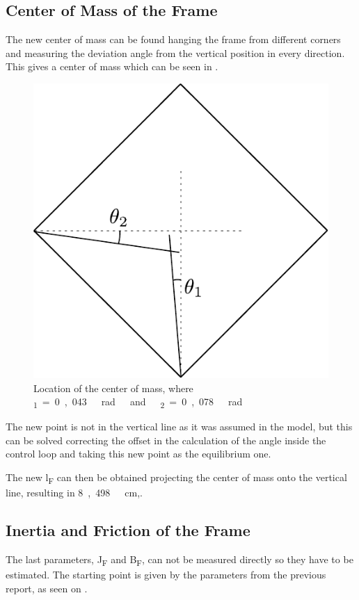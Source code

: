 \subsection{Center of Mass of the Frame}
The new center of mass can be found hanging the frame from different corners and measuring the deviation angle from the vertical position in every direction. This gives a center of mass which can be seen in . 
\begin{figure}[H]
	\centering
	\includegraphics[scale=0.6]{figures/centerOfMassDiagram}
	\caption{Location of the center of mass, where \si{\theta_1=0,043\ rad\ and\ \theta_2=0,078\ rad}}
	\label{centerOfMassDiagram}
\end{figure}

The new point is not in the vertical line as it was assumed in the model, but this can be solved correcting the offset in the calculation of the angle inside the control loop and taking this new point as the equilibrium one. 

The new \si{l_F} can then be obtained projecting the center of mass onto the vertical line, resulting in \si{8,498\ cm},.

\subsection{Inertia and Friction of the Frame}
The last parameters, \si{J_F} and \si{B_F}, can not be measured directly so they have to be estimated. The starting point is given by the parameters from the previous report, as seen on \cite{SVJohansen}.

